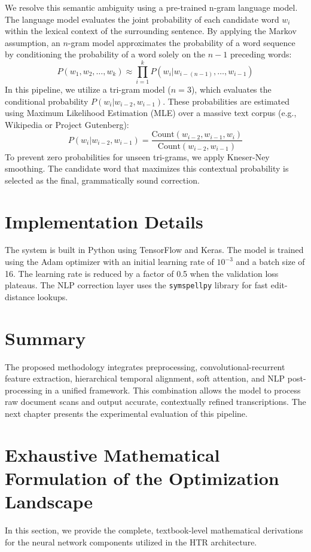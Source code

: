 We resolve this semantic ambiguity using a pre-trained n-gram language model. The language model evaluates the joint probability of each candidate word $w_i$ within the lexical context of the surrounding sentence. By applying the Markov assumption, an $n$-gram model approximates the probability of a word sequence by conditioning the probability of a word solely on the $n-1$ preceding words:
\begin{equation}
    P(w_1, w_2, \dots, w_k) \approx \prod_{i=1}^k P(w_i | w_{i-(n-1)}, \dots, w_{i-1})
\end{equation}
In this pipeline, we utilize a tri-gram model ($n=3$), which evaluates the conditional probability $P(w_i | w_{i-2}, w_{i-1})$. These probabilities are estimated using Maximum Likelihood Estimation (MLE) over a massive text corpus (e.g., Wikipedia or Project Gutenberg):
\begin{equation}
    P(w_i | w_{i-2}, w_{i-1}) = \frac{\text{Count}(w_{i-2}, w_{i-1}, w_i)}{\text{Count}(w_{i-2}, w_{i-1})}
\end{equation}
To prevent zero probabilities for unseen tri-grams, we apply Kneser-Ney smoothing. The candidate word that maximizes this contextual probability is selected as the final, grammatically sound correction.

\section{Implementation Details}
The system is built in Python using TensorFlow and Keras. The model is trained using the Adam optimizer with an initial learning rate of $10^{-3}$ and a batch size of 16. The learning rate is reduced by a factor of 0.5 when the validation loss plateaus. The NLP correction layer uses the \texttt{symspellpy} library for fast edit-distance lookups.

\section{Summary}
The proposed methodology integrates preprocessing, convolutional-recurrent feature extraction, hierarchical temporal alignment, soft attention, and NLP post-processing in a unified framework. This combination allows the model to process raw document scans and output accurate, contextually refined transcriptions. The next chapter presents the experimental evaluation of this pipeline.

\section{Exhaustive Mathematical Formulation of the Optimization Landscape}
In this section, we provide the complete, textbook-level mathematical derivations for the neural network components utilized in the HTR architecture.

